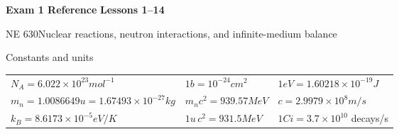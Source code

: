 \thispagestyle{handoutfirst}
\vspace*{\dimexpr-\headheight-\headsep\relax}
\begin{tcolorbox}[enhanced,frame hidden,colback=white,left=6pt,right=0pt,
  top=1pt,bottom=1pt,borderline west={4pt}{0pt}{KSUPurple},
  before skip=0pt,after skip=4pt]
  {\sffamily\bfseries\fontsize{17}{19}\selectfont Exam 1 Reference}
  \hfill {\sffamily\bfseries\large Lessons 1--14}\par
  {\sffamily\small NE 630\quad Nuclear reactions, neutron interactions, and infinite-medium balance}
\end{tcolorbox}
\begin{fixedbox}{Constants and units}
\begin{tabularx}{\linewidth}{@{}XXX@{}}
$N_A=6.022\times10^{23}\unit{mol^{-1}}$ &
$1\unit{b}=10^{-24}\unit{cm^2}$ &
$1\unit{eV}=1.60218\times10^{-19}\unit{J}$\\
$m_n=1.0086649\unit{u}=1.67493\times10^{-27}\unit{kg}$ &
$m_nc^2=939.57\unit{MeV}$ &
$c=2.9979\times10^8\unit{m/s}$\\
$k_B=8.6173\times10^{-5}\unit{eV/K}$ &
$1\unit{u}\,c^2=931.5\unit{MeV}$ &
$1\unit{Ci}=3.7\times10^{10}$ decays/s
\end{tabularx}
\end{fixedbox}
